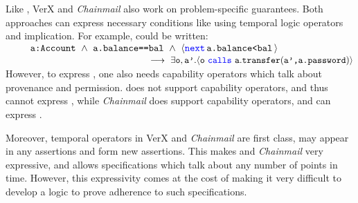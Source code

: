 Like \Nec, VerX \cite{VerX} and  \emph{Chainmail} \cite{FASE} also work on problem-specific guarantees.
Both  approaches can express necessary conditions
  like \SrobustA using
  temporal logic operators and implication. For example,  \SrobustA
 could be  written: %
\\
 $\strut ~  ~ \hspace{.25in} \strut  \prg{a:Account} \ \wedge\ \prg{a.balance==bal}  \ \wedge\ 
\langle {\color{blue}\texttt{next}}\, \prg{a.balance<bal} \, \rangle $\\
 $\strut ~ \hspace{2.1in} \strut \strut \strut \longrightarrow\   \exists {\texttt{o}},{\texttt{a'}}. \langle {\texttt{o}}\ {\color{blue}\texttt{calls}}\ {\texttt{a}}.{\texttt{transfer}}({\texttt{a',a.password}}) \rangle $
 \\
%
 However, to express \SrobustB, one also needs   capability operators which talk about 
 provenance   and
  permission.
   {}  does not support capability operators, and thus cannot express   \SrobustB, 
   while  \emph{Chainmail} does support capability operators, and can express  \SrobustB.  

Moreover, temporal operators in VerX   and  \emph{Chainmail}  are first class, \ie may appear in any assertions 
and form new assertions. This makes {\sc{VerX}}   and  \emph{Chainmail} very expressive,
and allows specifications which talk about any number of points in time.
However, this expressivity comes at the cost of making it very difficult to develop a logic to
prove adherence to such specifications.








